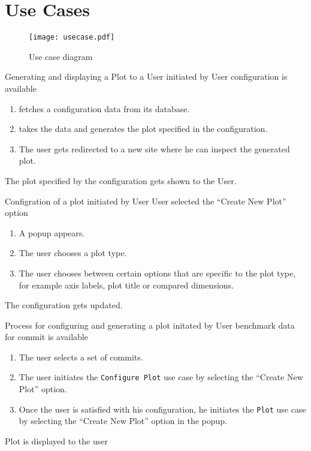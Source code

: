 \section{Use Cases}

\begin{figure}[H]
    \texttt{[image: usecase.pdf]}
    \caption{Use case diagram}
    \label{fig:usecase}
\end{figure}

{Generating and displaying a Plot to a User}
{initiated by User}
{\gls{configuration} is available}
{\begin{enumerate}
    \item \parkview{} fetches a \gls{configuration} data from its database.
    \item \parkview{} takes the data and generates the plot specified in the \gls{configuration}.
    \item The user gets redirected to a new site where he can inspect the generated \gls{plot}.
\end{enumerate}}
{The plot specified by the \gls{configuration} gets shown to the User.}

\bigskip

{Configration of a \gls{plot}}
{initiated by User}
{User selected the \enquote{Create New Plot} option}
{\begin{enumerate}
    \item A popup appears.
    \item The user chooses a \gls{plot} type.
    \item The user chooses between certain options that are specific to the plot type, for example axis labels, plot title or compared dimensions.
\end{enumerate}}
{The \gls{configuration} gets updated.}

\bigskip

{Process for configuring and generating a plot}
{initated by User}
{benchmark data for commit is available}
{\begin{enumerate}
    \item The user selects a set of commits.
    \item The user initiates the \texttt{Configure Plot} use case by selecting the \enquote{Create New Plot} option.
    \item Once the user is satisfied with his \gls{configuration}, he initiates the \texttt{Plot} use case by selecting the \enquote{Create New Plot} option in the popup.
\end{enumerate}}
{Plot is displayed to the user}

